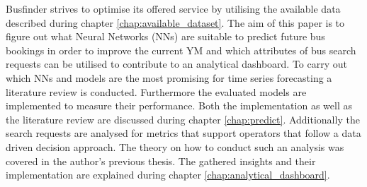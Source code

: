 \newline
\newline
Busfinder strives to optimise its offered service by utilising the available data described during chapter \ref{chap:available_dataset}. The aim of this paper is to figure out what Neural Networks (NNs) are suitable to predict future bus bookings in order to improve the current YM and which attributes of bus search requests can be utilised to contribute to an analytical dashboard. To carry out which NNs and models are the most promising for time series forecasting a literature review is conducted. Furthermore the evaluated models are implemented to measure their performance. Both the implementation as well as the literature review are discussed during chapter \ref{chap:predict}. Additionally the search requests are analysed for metrics that support operators that follow a data driven decision approach. The theory on how to conduct such an analysis was covered in the author's previous thesis. The gathered insights and their implementation are explained during chapter \ref{chap:analytical_dashboard}.


